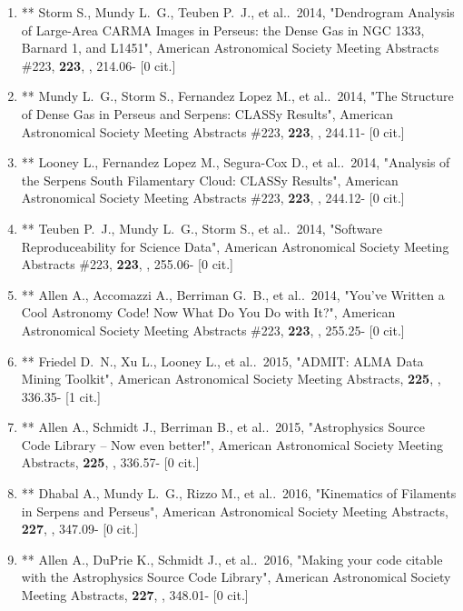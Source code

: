 \documentclass[11pt,letterpaper]{article}
\begin{document}
\begin{enumerate}[resume,label=\textbf{\arabic*}.]
\item   **
  Storm S., Mundy L.~G., Teuben P.~J., et al..\  2014,  "Dendrogram 
Analysis of Large-Area CARMA Images in Perseus: the Dense Gas in NGC 1333, 
Barnard 1, and L1451", American Astronomical Society Meeting Abstracts 
\#223,  {\bf 223}, , 214.06- [0 cit.] %

\item **
  Mundy L.~G., Storm S., Fernandez Lopez M., et al..\  2014,  "The 
Structure of Dense Gas in Perseus and Serpens: CLASSy Results", American 
Astronomical Society Meeting Abstracts \#223,  {\bf 223}, , 244.11- [0 
cit.] %

\item   **
  Looney L., Fernandez Lopez M., Segura-Cox D., et al..\  2014,  
"Analysis of the Serpens South Filamentary Cloud: CLASSy Results", American 
Astronomical Society Meeting Abstracts \#223,  {\bf 223}, , 244.12- [0 
cit.] %

\item   **
  Teuben P.~J., Mundy L.~G., Storm S., et al..\  2014,  "Software 
Reproduceability for Science Data", American Astronomical Society Meeting 
Abstracts \#223,  {\bf 223}, , 255.06- [0 cit.] %



\item   **
  Allen A., Accomazzi A., Berriman G.~B., et al..\  2014,  "You've 
Written a Cool Astronomy Code! Now What Do You Do with It?", American 
Astronomical Society Meeting Abstracts \#223,  {\bf 223}, , 255.25- [0 
cit.] %

\item   **
  Friedel D.~N., Xu L., Looney L., et al..\  2015,  "ADMIT: ALMA Data 
Mining Toolkit", American Astronomical Society Meeting Abstracts,  {\bf 
225}, , 336.35- [1 cit.] %

\item   **
  Allen A., Schmidt J., Berriman B., et al..\  2015,  "Astrophysics 
Source Code Library -- Now even better!", American Astronomical Society 
Meeting Abstracts,  {\bf 225}, , 336.57- [0 cit.] %

\item  **
  Dhabal A., Mundy L.~G., Rizzo M., et al..\  2016,  "Kinematics of 
Filaments in Serpens and Perseus", American Astronomical Society Meeting 
Abstracts,  {\bf 227}, , 347.09- [0 cit.] %

\item  **
  Allen A., DuPrie K., Schmidt J., et al..\  2016,  "Making your code 
citable with the Astrophysics Source Code Library", American Astronomical 
Society Meeting Abstracts,  {\bf 227}, , 348.01- [0 cit.] %



\end{enumerate}
\end{document}
